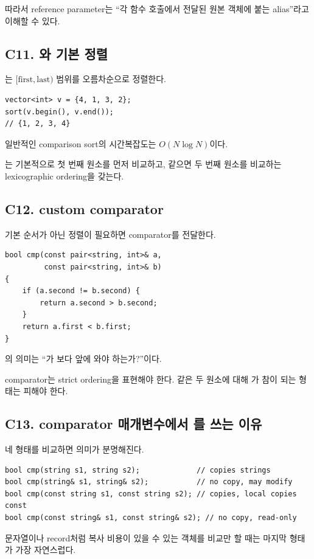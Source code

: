 따라서 reference parameter는 ``각 함수 호출에서 전달된 원본 객체에 붙는 alias''라고 이해할 수 있다.

\subsection{C11. 와 기본 정렬}
는 $[\text{first},\text{last})$ 범위를 오름차순으로 정렬한다.
\begin{lstlisting}
vector<int> v = {4, 1, 3, 2};
sort(v.begin(), v.end());
// {1, 2, 3, 4}
\end{lstlisting}

일반적인 comparison sort의 시간복잡도는 $O(N\log N)$이다.

는 기본적으로 첫 번째 원소를 먼저 비교하고, 같으면 두 번째 원소를 비교하는 lexicographic ordering을 갖는다.

\subsection{C12. custom comparator}
기본 순서가 아닌 정렬이 필요하면 comparator를 전달한다.
\begin{lstlisting}
bool cmp(const pair<string, int>& a,
         const pair<string, int>& b)
{
    if (a.second != b.second) {
        return a.second > b.second;
    }
    return a.first < b.first;
}
\end{lstlisting}

의 의미는 ``가 보다 앞에 와야 하는가?''이다.

comparator는 strict ordering을 표현해야 한다. 같은 두 원소에 대해 가 참이 되는 \code{<=} 형태는 피해야 한다.

\subsection{C13. comparator 매개변수에서 를 쓰는 이유}
네 형태를 비교하면 의미가 분명해진다.
\begin{lstlisting}
bool cmp(string s1, string s2);             // copies strings
bool cmp(string& s1, string& s2);           // no copy, may modify
bool cmp(const string s1, const string s2); // copies, local copies const
bool cmp(const string& s1, const string& s2); // no copy, read-only
\end{lstlisting}

문자열이나 record처럼 복사 비용이 있을 수 있는 객체를 비교만 할 때는 마지막 형태가 가장 자연스럽다.


